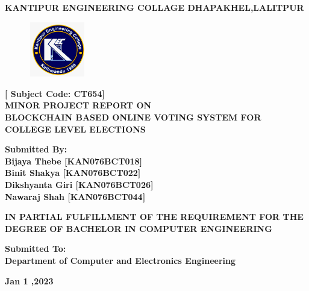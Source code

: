 \documentclass[a4paper,12pt]{report}
\begin{document}

\begin{titlepage}
   \begin{center}
       \vspace*{1cm}

       \textbf{\large {\bf KANTIPUR ENGINEERING COLLAGE
                       DHAPAKHEL,LALITPUR} }
                       
        \begin{figure}[htb!]
              \centering
              \includegraphics[width=2.5cm, height=2.4cm]{ClzLogo}             
        \end{figure}
        
        \hspace{0.5cm}
       \textbf{\small{ [ Subject Code: CT654] }}\\
     {\bf MINOR PROJECT REPORT ON \\ BLOCKCHAIN BASED ONLINE VOTING SYSTEM FOR COLLEGE LEVEL ELECTIONS }
     
       \vspace{2.3cm}
    \textbf{\small
                Submitted By:\\
                Bijaya Thebe   [KAN076BCT018] \\
                Binit Shakya    [KAN076BCT022] \\
                Dikshyanta Giri [KAN076BCT026] \\
                Nawaraj Shah [KAN076BCT044] \\
                }


        \vspace{2cm}
         \textbf{\small{IN PARTIAL FULFILLMENT OF THE REQUIREMENT 
         FOR THE DEGREE OF  BACHELOR IN COMPUTER ENGINEERING}}
            
            
       \vspace{1.5cm}


       \vfill
            
       \vspace{0.8cm}
            
       \textbf{\small
           Submitted To:\\
           Department of Computer and Electronics Engineering
           }
           
           \vfill
       \vspace{0.5cm}
         \textbf{\small  Jan 1 ,2023}
            
   \end{center}
\end{titlepage}
\end{document}
